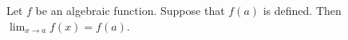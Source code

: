 \begin{frame}
\begin{theorem}
Let $f$ be an algebraic function.  
Suppose that $f(a)$ is defined.  
Then $\displaystyle \lim_{x\to a}f(x) = f(a)$.
\end{theorem}
\end{frame}

